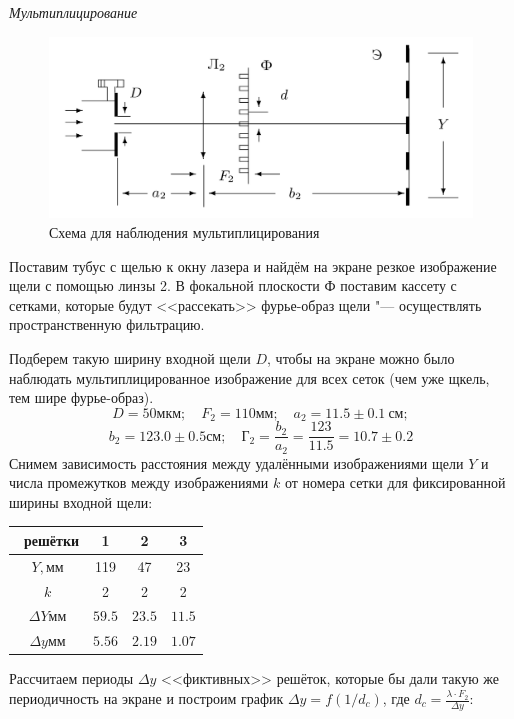 \documentclass[a4paper, 12pt]{article}%
\newcommand{\RomanNumeralCaps}[1]{\uppercase\expandafter{\romannumeral#1}}
\begin{document}
\newpage

\RomanNumeralCaps 5 \textit{Мультиплицирование}
	\begin{figure}[H]
		\begin{center}
		\includegraphics[width = 0.6\linewidth]{4.png}
		\caption{Схема для наблюдения мультиплицирования}
		\end{center}
	\end{figure}	
	Поставим тубус с щелью к окну лазера и найдём на экране резкое изображение щели с помощью линзы 2. В фокальной плоскости Ф поставим кассету с сетками, которые будут <<рассекать>> фурье-образ щели "--- осуществлять пространственную фильтрацию.
	
	Подберем такую ширину входной щели $D$, чтобы на экране можно было наблюдать мультиплицированное изображение для всех сеток (чем уже щкель, тем шире фурье-образ).
	\[
	D = 50 \text{мкм}; \quad F_2 = 110 \text{мм}; \quad a_2  = 11.5 \pm 0.1 \ \text{см}; 
	\]
	\[
	b_2 = 123.0 \pm 0.5  \text{см}; \quad \text{Г}_2 = \frac{b_2}{a_2} = \frac{123}{11.5} = 10.7 \pm 0.2
	\]
	Снимем зависимость расстояния между удалёнными изображениями щели $Y$ и числа промежутков между изображениями $k$ от номера сетки для фиксированной ширины входной щели:
	\begin{table}[H]
		\centering
		\begin{tabular}{|c|c|c|c|}  \hline
			\textnumero\ решётки & 1 & 2 & 3 \\\hline
			$Y, \text{мм}$ & 119 & 47 & 23  \\\hline
			$k$ & 2 & 2 & 2 \\\hline
			$\Delta Y \text{мм}$ & $59.5$ & $23.5$ & $11.5$ \\\hline
			
			$\Delta y  \text{мм}$ & $5.56 $ & $2.19 $ & $1.07$\\\hline
		\end{tabular}
	\end{table}
	Рассчитаем периоды $\Delta y$ <<фиктивных>> решёток, которые бы дали такую же периодичность на экране и построим график $\Delta y = f(1/ d_c)$, где $d_c = \frac{\lambda \cdot F_2}{\Delta y}$:

	
	
\end{document}
